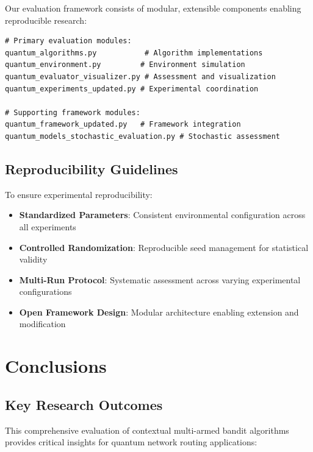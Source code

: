 \documentclass[12pt,a4paper]{article}
\begin{document}
Our evaluation framework consists of modular, extensible components enabling reproducible research:

\begin{lstlisting}[caption=Core Framework Components]
# Primary evaluation modules:
quantum_algorithms.py           # Algorithm implementations
quantum_environment.py         # Environment simulation
quantum_evaluator_visualizer.py # Assessment and visualization
quantum_experiments_updated.py # Experimental coordination

# Supporting framework modules:
quantum_framework_updated.py   # Framework integration
quantum_models_stochastic_evaluation.py # Stochastic assessment
\end{lstlisting}

\subsection{Reproducibility Guidelines}

To ensure experimental reproducibility:

\begin{itemize}
\item \textbf{Standardized Parameters}: Consistent environmental configuration across all experiments
\item \textbf{Controlled Randomization}: Reproducible seed management for statistical validity
\item \textbf{Multi-Run Protocol}: Systematic assessment across varying experimental configurations
\item \textbf{Open Framework Design}: Modular architecture enabling extension and modification
\end{itemize}


\newpage
\section{Conclusions}

\subsection{Key Research Outcomes}

This comprehensive evaluation of contextual multi-armed bandit algorithms provides critical insights for quantum network routing applications:
\end{document}

